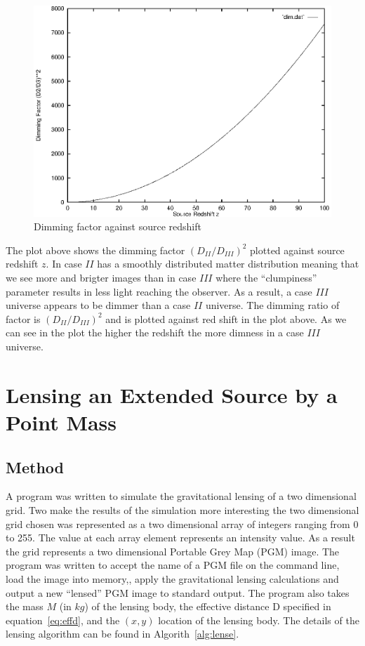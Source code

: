 \documentclass[a4paper]{IEEEtran}
\begin{document}
\begin{figure}
    \caption{Dimming factor against source redshift}
    \label{fig:dimming}
    \begin{center}
        \includegraphics[width=\columnwidth]{results/dim.eps}
    \end{center}
\end{figure}

The plot above shows the dimming factor $(D_{II}/D_{III})^2$ plotted
against source redshift $z$. In case $II$ has a smoothly distributed
matter distribution meaning that we see more and brigter images than
in case $III$ where the ``clumpiness'' parameter results in less
light reaching the observer. As a result, a case $III$ universe appears
to be dimmer than a case $II$ universe. The dimming ratio of factor
is $(D_{II}/D_{III})^2$ and is plotted against red shift in the plot above.
As we can see in the plot the higher the redshift the more dimness in
a case $III$ universe.

\section{Lensing an Extended Source by a Point Mass}
    \subsection{Method}
    A program was written to simulate the gravitational lensing 
    of a two dimensional grid. Two make the results of the simulation
    more interesting the two dimensional grid chosen was represented
    as a two dimensional array of integers ranging from 0 to 255.
    The value at each array element represents an intensity value. As a result
    the grid represents a two dimensional Portable Grey Map (PGM) image.
    The program was written to accept the name of a PGM file on the command
    line, load the image into memory,, apply the gravitational lensing calculations
    and output a new ``lensed'' PGM image to standard output. The program
    also takes the mass $M$ (in $kg$) of the lensing body, the effective
    distance D specified in equation~\ref{eq:effd}, and the $(x,y)$
    location of the lensing body.
    The details of the lensing algorithm can be found in Algorith~\ref{alg:lense}.
\end{document}
